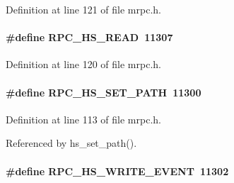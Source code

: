 \begin{DoxyItemize}
\item 
\end{DoxyItemize}

Definition at line 121 of file mrpc.h.
\paragraph[{RPC\_\-HS\_\-READ}]{\setlength{\rightskip}{0pt plus 5cm}\#define RPC\_\-HS\_\-READ~11307}\hfill\label{group__mrpcdefineh_gae54df220cd65f15f7669bba8f031e6a6}

\begin{DoxyItemize}
\item 
\end{DoxyItemize}

Definition at line 120 of file mrpc.h.
\paragraph[{RPC\_\-HS\_\-SET\_\-PATH}]{\setlength{\rightskip}{0pt plus 5cm}\#define RPC\_\-HS\_\-SET\_\-PATH~11300}\hfill\label{group__mrpcdefineh_gae96ac179fd36bfa722adab529b8d547e}

\begin{DoxyItemize}
\item 
\end{DoxyItemize}

Definition at line 113 of file mrpc.h.

Referenced by hs\_\-set\_\-path().
\paragraph[{RPC\_\-HS\_\-WRITE\_\-EVENT}]{\setlength{\rightskip}{0pt plus 5cm}\#define RPC\_\-HS\_\-WRITE\_\-EVENT~11302}\hfill\label{group__mrpcdefineh_ga79eecfeb4c159e74bd640263f08a92af}

\begin{DoxyItemize}
\item 
\end{DoxyItemize}

